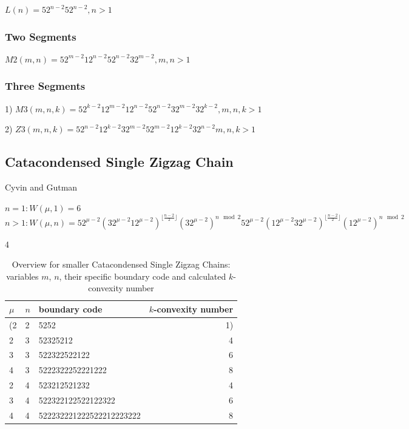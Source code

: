 \documentclass[a4paper,10pt]{article}
\begin{document}
{$L(n) = 52^{n-2}52^{n-2} , n>1$

\subsubsection{Two Segments}

$M2(m,n) = 52^{m-2}12^{n-2}52^{n-2}32^{m-2}, m,n>1$

\subsubsection{Three Segments}

1) $M3(m,n,k) = 52^{k-2}12^{m-2}12^{n-2}52^{n-2}32^{m-2}32^{k-2}, m,n,k>1$


2) $Z3(m,n,k) = 52^{n-2}12^{k-2}32^{m-2}52^{m-2}12^{k-2}32^{n-2} m,n,k>1$


\subsection{Catacondensed Single Zigzag Chain}

Cyvin and Gutman~\cite[p.~63]{cyvin_1988}

\cite{gordon_1952}
\cite{yen_1971}
\cite{balaban_1985}

$n = 1 : W(\mu,1) = 6$\\
$n > 1 : W(\mu,n) =5 2^{\mu-2} (3 2^{\mu-2} 1 2^{\mu-2})^{\lfloor\frac{n-2}{2}\rfloor} (3 2^{\mu-2})^{n \mod 2}
5 2^{\mu-2} (1 2^{\mu-2}3 2^{\mu-2})^{\lfloor\frac{n-2}{2}\rfloor} (1 2^{\mu-2})^{n \mod 2}$

\begin{table}4
 \caption{Overview for smaller Catacondensed Single Zigzag Chains: variables $m$, $n$, their specific boundary code and calculated $k$-convexity number}
 \medskip
 \begin{tabular}{|l l l r|}
  \hline
  $\mu$ & $n$ & boundary code & $k$-convexity number\\
  \hline
  (2 & 2 & 5252 & 1)\\
  2 & 3 & 52325212 & 4\\
  3 & 3 & 522322522122 & 6\\
  4 & 3 & 5222322252221222 & 8\\
  \hline
  2 & 4 & 523212521232 & 4\\
  3 & 4 & 522322122522122322 & 6\\
  4 & 4 & 522232221222522212223222 & 8\\ 
  \hline
 \end{tabular}
\end{table}

}
\end{document}
